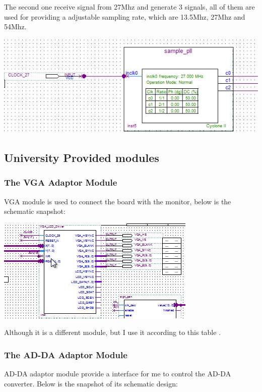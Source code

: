 \documentclass[11pt]{scrartcl}
\begin{document}
The second one receive signal from 27Mhz and generate 3 signals, all of them are used for providing a adjustable sampling rate, which are 13.5Mhz, 27Mhz and 54Mhz. 

\begin{minipage}[t]{\linewidth}

{
\includegraphics[scale = 0.5]{pll2.png}
}
\end{minipage}
\medskip

\subsection{University Provided modules}
\subsubsection{The VGA Adaptor Module}
\label{sec:vga}
VGA module is used to connect the board with the monitor, below is the schematic snapshot:

\begin{minipage}[t]{\linewidth}

{
\includegraphics[scale = 1]{vga.png}
}
\end{minipage}
\medskip

Although it is a different module, but I use it according to this table \cite{vgaadaptor}.

\subsubsection{The AD-DA Adaptor Module}
\label{sec:adda}
AD-DA adaptor module provide a interface for me to control the AD-DA converter. Below is the snapshot of its schematic design:
\end{document}
